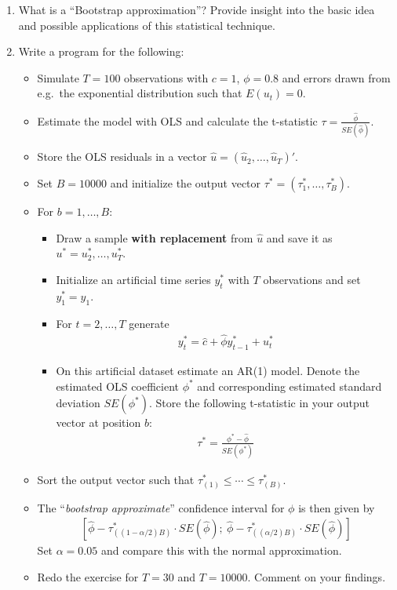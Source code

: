 \begin{enumerate}
\item
What is a \enquote{Bootstrap approximation}?
Provide insight into the basic idea and possible applications of this statistical technique.

\item
Write a program for the following:
\begin{itemize}
  \item Simulate \(T=100\) observations with \(c=1\), \(\phi=0.8\)
    and errors drawn from e.g.\ the exponential distribution such that \(E(u_t)=0\).
  \item Estimate the model with OLS and calculate the t-statistic
    \(\tau=\frac{\hat{\phi}}{SE(\hat{\phi})}\). 
  \item Store the OLS residuals in a vector
    \(\hat{u} = (\hat{u}_{2},\ldots ,\hat{u}_{T})'\).
  \item Set \(B=10000\) and initialize the output vector
    \(\tau^{\ast} = (\tau_1^\ast,\ldots,\tau_B^\ast)\).
  \item For \( b=1,\ldots,B \):
  \begin{itemize}
    \item Draw a sample \textbf{with replacement} from \(\hat{u}\)
      and save it as \(u^{\ast} = u_{2}^{\ast},\ldots ,u_{T}^{\ast }\).
    \item Initialize an artificial time series \( y_t^\ast \) with \(T\) observations
      and set \(y_1^\ast = y_1\).
    \item For \(t=2,\ldots ,T\) generate
    \begin{align*}
    y_{t}^{\ast }=\hat{c}+\hat{\phi}y^\ast_{t-1}+u_{t}^{\ast }
    \end{align*}
    \item On this artificial dataset estimate an AR{(1)} model.
    Denote the estimated OLS coefficient \(\phi^\ast \)
      and corresponding estimated standard deviation \(SE(\phi^\ast)\).
    Store the following t-statistic in your output vector at position \(b\):
    \begin{align*}
    \tau^\ast = \frac{\phi^\ast - \hat{\phi}}{SE(\phi^\ast)}
    \end{align*}
    \end{itemize}
    \item Sort the output vector such that \(\tau_{(1)}^\ast \leq \cdots \leq \tau_{(B)}^\ast \).
    \item The \enquote{\emph{bootstrap approximate}} confidence interval for \(\phi \) is then given by
    \begin{align*}
    \left[ \hat{\phi}-\tau_{((1-\alpha /2)B)}^{\ast }\cdot SE(\hat{\phi});\ \hat{\phi}-\tau_{((\alpha/2)B)}^{\ast }\cdot SE(\hat{\phi})\right] 
    \end{align*}
    Set \(\alpha=0.05\) and compare this with the normal approximation.
    \item Redo the exercise for \(T=30\) and \(T=10000\). Comment on your findings.
\end{itemize}

\end{enumerate}

